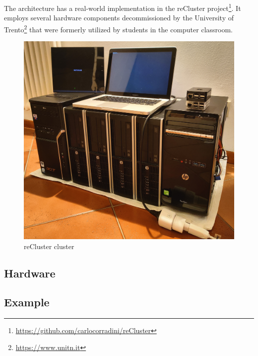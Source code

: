 The architecture has a real-world implementation in the reCluster project\footnote{\url{https://github.com/carlocorradini/reCluster}}.
It employs several hardware components decommissioned by the University of
Trento\footnote{\url{https://www.unitn.it}} that were formerly utilized by
students in the computer classroom.

\begin{figure}[htbp]
  \centering
  \includegraphics[width=.9\textwidth]{images/architecture/cluster.jpg}
  \caption{reCluster cluster}
\end{figure}

\subsection{Hardware}
\label{subsec:architecture_cluster_hardware}


\subsection{Example}
\label{subsec:architecture_cluster_example}

